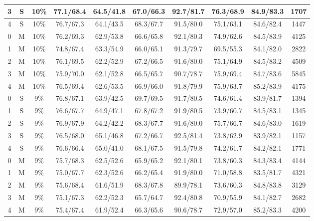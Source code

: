 \begin{table*}
\begin{tabular}{|c|c|c||c|c|c|c|c|c||c|}
3 & S & 10\% & 77.1/68.4 & 64.5/41.8 & 67.0/66.3 & 92.7/81.7 & 76.3/68.9 & 84.9/83.3 & 1707 \\ \hline
4 & S & 10\% & 76.7/67.3 & 64.1/43.5 & 68.3/67.7 & 91.5/80.0 & 75.1/63.1 & 84.6/82.4 & 1447 \\ \hline
0 & M & 10\% & 76.2/69.3 & 62.9/53.8 & 66.6/65.8 & 92.1/80.3 & 74.9/62.6 & 84.5/83.9 & 4125 \\ \hline
1 & M & 10\% & 74.8/67.4 & 63.3/54.9 & 66.0/65.1 & 91.3/79.7 & 69.5/55.3 & 84.1/82.0 & 2822 \\ \hline
2 & M & 10\% & 76.1/69.5 & 62.2/52.9 & 67.2/66.5 & 91.6/80.0 & 75.1/64.9 & 84.5/83.2 & 4509 \\ \hline
3 & M & 10\% & 75.9/70.0 & 62.1/52.8 & 66.5/65.7 & 90.7/78.7 & 75.9/69.4 & 84.7/83.6 & 5845 \\ \hline
4 & M & 10\% & 76.5/69.4 & 62.6/53.5 & 66.9/66.0 & 91.8/79.9 & 75.9/63.7 & 85.2/83.9 & 4175 \\ \hline
0 & S & 9\% & 76.8/67.1 & 63.9/42.5 & 69.7/69.5 & 91.7/80.5 & 74.6/61.4 & 83.9/81.7 & 1394 \\ \hline
1 & S & 9\% & 76.6/67.7 & 64.9/47.1 & 67.8/67.2 & 91.9/80.5 & 73.9/60.7 & 84.5/83.1 & 1345 \\ \hline
2 & S & 9\% & 76.9/67.9 & 64.2/42.2 & 68.3/67.7 & 91.6/80.0 & 75.7/66.7 & 84.6/83.0 & 1619 \\ \hline
3 & S & 9\% & 76.5/68.0 & 65.1/46.8 & 67.2/66.7 & 92.5/81.4 & 73.8/62.9 & 83.9/82.1 & 1157 \\ \hline
4 & S & 9\% & 76.6/66.4 & 65.0/41.0 & 68.1/67.5 & 91.5/79.8 & 74.2/61.7 & 84.2/82.1 & 1771 \\ \hline
0 & M & 9\% & 75.7/68.3 & 62.5/52.6 & 65.9/65.2 & 92.1/80.1 & 73.8/60.3 & 84.3/83.4 & 4144 \\ \hline
1 & M & 9\% & 75.0/67.7 & 62.3/52.6 & 66.2/65.4 & 91.9/80.0 & 71.0/58.8 & 83.5/81.7 & 4321 \\ \hline
2 & M & 9\% & 75.6/68.4 & 61.6/51.9 & 68.3/67.8 & 89.9/78.1 & 73.6/60.3 & 84.8/83.8 & 3129 \\ \hline
3 & M & 9\% & 75.1/67.3 & 62.2/52.3 & 65.7/64.7 & 92.4/80.8 & 70.9/55.9 & 84.1/82.7 & 2682 \\ \hline
4 & M & 9\% & 75.4/67.4 & 61.9/52.4 & 66.3/65.6 & 90.6/78.7 & 72.9/57.0 & 85.2/83.3 & 4200 \\ \hline

\end{tabular}
\end{table*}
